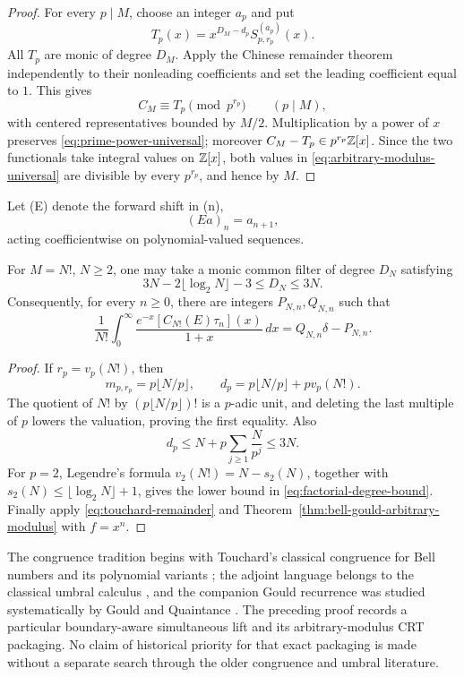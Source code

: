 \begin{proof}
For every \(p\mid M\), choose an integer \(a_p\) and put
\[
 T_p(x)=x^{D_M-d_p}S_{p,r_p}^{(a_p)}(x).
\]
All \(T_p\) are monic of degree \(D_M\).  Apply the Chinese remainder
theorem independently to their nonleading coefficients and set the leading
coefficient equal to \(1\).  This gives
\[
 C_M\equiv T_p\pmod{p^{r_p}}\qquad(p\mid M),
\]
with centered representatives bounded by \(M/2\).  Multiplication by a
power of \(x\) preserves \eqref{eq:prime-power-universal}; moreover
\(C_M-T_p\in p^{r_p}\mathbb Z[x]\).  Since the two functionals take integral
values on \(\mathbb Z[x]\), both values in
\eqref{eq:arbitrary-modulus-universal} are divisible by every
\(p^{r_p}\), and hence by \(M\).
\end{proof}

Let (E) denote the forward shift in (n),
\[
 (Ea)_n=a_{n+1},
\]
acting coefficientwise on polynomial-valued sequences.

\begin{corollary}
\label{cor:bell-gould-factorial}
For \(M=N!\), \(N\geq2\), one may take a monic common filter of degree
\(D_N\) satisfying
\begin{equation}\label{eq:factorial-degree-bound}
 3N-2\lfloor\log_2N\rfloor-3
 \leq D_N\leq3N.
\end{equation}
Consequently, for every \(n\geq0\), there are integers \(P_{N,n},Q_{N,n}\)
such that
\begin{equation}\label{eq:factorial-touchard-integral}
 \frac1{N!}\int_0^\infty
 \frac{e^{-x}[C_{N!}(E)\tau_n](x)}{1+x}\,dx
 =Q_{N,n}\delta-P_{N,n}.
\end{equation}
\end{corollary}

\begin{proof}
If \(r_p=v_p(N!)\), then
\[
 m_{p,r_p}=p\lfloor N/p\rfloor,
 \qquad
 d_p=p\lfloor N/p\rfloor+pv_p(N!).
\]
The quotient of \(N!\) by
\((p\lfloor N/p\rfloor)!\) is a \(p\)-adic unit, and deleting the last
multiple of \(p\) lowers the valuation, proving the first equality.  Also
\[
 d_p\leq N+p\sum_{j\geq1}\frac{N}{p^j}\leq3N.
\]
For \(p=2\), Legendre's formula
\(v_2(N!)=N-s_2(N)\), together with
\(s_2(N)\leq\lfloor\log_2N\rfloor+1\), gives the lower bound in
\eqref{eq:factorial-degree-bound}.  Finally apply
\eqref{eq:touchard-remainder} and
Theorem~\ref{thm:bell-gould-arbitrary-modulus} with \(f=x^n\).
\end{proof}

The congruence tradition begins with Touchard's classical congruence for
Bell numbers and its polynomial variants
\cite{Touchard1933,SunZagier2011}; the adjoint language belongs to the
classical umbral calculus \cite{Roman1984}, and the companion Gould
recurrence was studied systematically by Gould and Quaintance
\cite{GouldQuaintance2007}.  The preceding proof records a particular
boundary-aware simultaneous lift and its arbitrary-modulus CRT packaging.
No claim of historical priority for that exact packaging is made without a
separate search through the older congruence and umbral literature.

